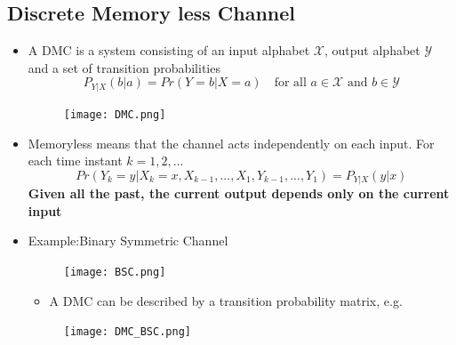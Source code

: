 \documentclass[12pt]{article}
\begin{document}
\subsection{Discrete Memory less Channel}
\begin{itemize}
    \item A DMC is a system consisting of an input alphabet $ \mathcal{X}$, output alphabet $\mathcal{Y}$ and a set of transition probabilities
\[
P_{Y|X}(b|a) = Pr(Y=b|X=a) \quad \textrm{for all } a \in \mathcal{X} \textrm{ and } b \in \mathcal{Y} 
\]
\begin{figure}[h]
    \centering
    \texttt{[image: DMC.png]}
    \label{fig:dmc}
\end{figure}

    \item Memoryless means that the channel acts independently on each input. For each time instant $k=1,2,...$
    \[
    Pr(Y_k=y|X_k=x,X_{k-1},...,X_1,Y_{k-1},...,Y_1) = P_{Y|X}(y|x)
    \]
    \textcolor{blue1}{\textbf{Given all the past, the current output depends only on the current input}}
    
    \item Example:Binary Symmetric Channel 
    \begin{figure}[H]
    \centering
    \texttt{[image: BSC.png]}
    \end{figure}
    \begin{itemize}
        \item A DMC can be described by a transition probability matrix, e.g. 
    \end{itemize}
    \begin{figure}[h]
    \centering
    \texttt{[image: DMC\_BSC.png]}
    \end{figure}
    

\end{itemize}
\end{document}
